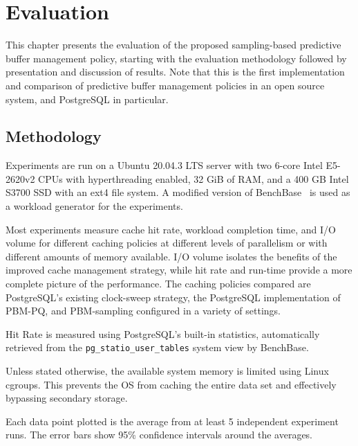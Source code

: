 
\chapter{Evaluation}
\label{ch:evaluation}

This chapter presents the evaluation of the proposed sampling-based predictive buffer management policy, starting with the evaluation methodology followed by presentation and discussion of results. Note that this is the first implementation and comparison of predictive buffer management policies in an open source system, and PostgreSQL in particular.

\section{Methodology}
Experiments are run on a Ubuntu 20.04.3 LTS server with two 6-core Intel E5-2620v2 CPUs with hyperthreading enabled, 32 GiB of RAM, and a 400 GB Intel S3700 SSD with an ext4 file system. A modified version of BenchBase~\cite{BenchBase} is used as a workload generator for the experiments.


Most experiments measure cache hit rate, workload completion time, and I/O volume for different caching policies at different levels of parallelism or with different amounts of memory available. I/O volume isolates the benefits of the improved cache management strategy, while hit rate and run-time provide a more complete picture of the performance. The caching policies compared are PostgreSQL's existing clock-sweep strategy, the PostgreSQL implementation of PBM-PQ, and PBM-sampling configured in a variety of settings.

Hit Rate is measured using PostgreSQL's built-in statistics, automatically retrieved from the \verb|pg_statio_user_tables| system view by BenchBase.

Unless stated otherwise, the available system memory is limited using Linux cgroups. This prevents the OS from caching the entire data set and effectively bypassing secondary storage.

Each data point plotted is the average from at least 5 independent experiment runs. The error bars show 95\% confidence intervals around the averages.


